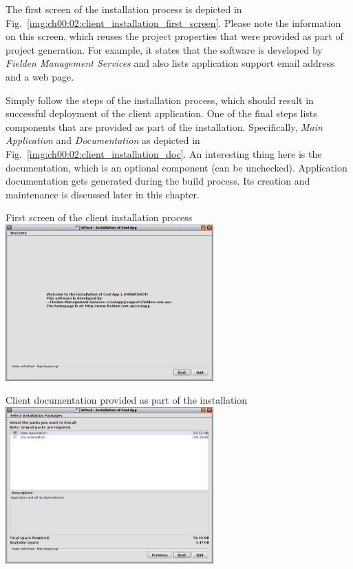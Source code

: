   The first screen of the installation process is depicted in Fig.~\ref{img:ch00:02:client_installation_first_screen}.
  Please note the information on this screen, which reuses the project properties that were provided as part of project generation.
  For example, it states that the software is developed by \emph{Fielden Management Services} and also lists application support email address and a web page.
  
  Simply follow the steps of the installation process, which should result in successful deployment of the client application.
  One of the final steps lists components that are provided as part of the installation.
  Specifically, \emph{Main Application} and \emph{Documentation} as depicted in Fig.~\ref{img:ch00:02:client_installation_doc}.
  An interesting thing here is the documentation, which is an optional component (can be unchecked).
  Application documentation gets generated during the build process.
  Its creation and maintenance is discussed later in this chapter.

  \begin{image}{First screen of the client installation process}{\label{img:ch00:02:client_installation_first_screen}}    
    \includegraphics[width=0.6\textwidth]{parts/00-part/chapters/01-application-modules/images/01-client-installation.png}
  \end{image}

  \begin{image}{Client documentation provided as part of the installation}{\label{img:ch00:02:client_installation_doc}}    
    \includegraphics[width=0.6\textwidth]{parts/00-part/chapters/01-application-modules/images/02-client-installation-doc.png}
  \end{image}

